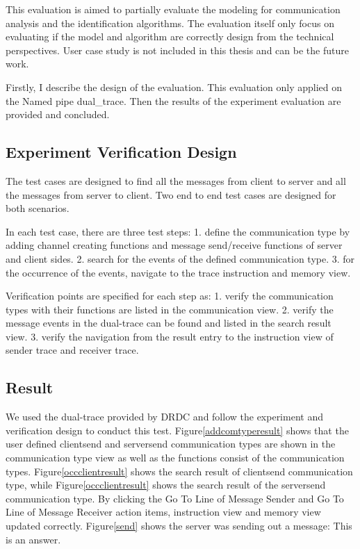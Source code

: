 \label{chapter:Exp}
This evaluation is aimed to partially evaluate the modeling for communication analysis and the identification algorithms. The evaluation itself only focus on evaluating if the model and algorithm are correctly design from the technical perspectives. User case study is not included in this thesis and can be the future work.

Firstly, I describe the design of the evaluation. This evaluation only applied on the Named pipe dual\_trace. Then the results of the experiment evaluation are provided and concluded.

\subsection{Experiment Verification Design}
The test cases are designed to find all the messages from client to server and all the messages from server to client. Two end to end test cases are designed for both scenarios. 

In each test case, there are three test steps: 1. define the communication type by adding channel creating functions and message send/receive functions of server and client sides. 2. search for the events of  the defined communication type. 3. for the occurrence of the events, navigate to the trace instruction and memory view.

Verification points are specified for each step as: 1. verify the communication types with their functions are listed in the communication view. 2. verify the message events in the dual-trace can be found and listed in the search result view. 3. verify the navigation from the result entry to the instruction view of sender trace and receiver trace.
\subsection{Result}
We used the dual-trace provided by DRDC and follow the experiment and verification design to conduct this test. Figure\ref{addcomtyperesult} shows that the user defined clientsend and serversend communication types are shown in the communication type view as well as the functions consist of the communication types. Figure\ref{occclientresult} shows the search result of clientsend communication type, while Figure\ref{occclientresult} shows the search result of the serversend communication type. By clicking the Go To Line of Message Sender and Go To Line of Message Receiver action items, instruction view and memory view updated correctly. Figure\ref{send} shows the server was sending out a message: This is an answer. 


